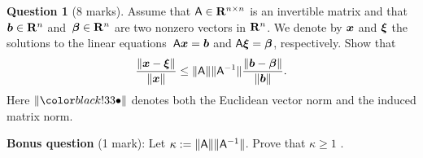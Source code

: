 \documentclass[11pt]{article}
\theoremstyle{definition}
\newtheorem{question}{Question}
\begin{document}
\newpage
\begin{question}
    [8 marks]
    Assume that $\mathsf A \in \mathbf R^{n \times n}$ is an invertible matrix
    and that $\mathbf{\boldsymbol{b}} \in \mathbf R^n$ and~$\mathbf{\boldsymbol{\beta}} \in \mathbf R^n$ are two nonzero vectors in $\mathbf R^n$.
    We denote by $\mathbf{\boldsymbol{x}}$ and $\mathbf{\boldsymbol{\xi}}$ the solutions to the linear equations~$\mathsf A \mathbf{\boldsymbol{x}} = \mathbf{\boldsymbol{b}}$ and $\mathsf A \mathbf{\boldsymbol{\xi}} = \mathbf{\boldsymbol{\beta}}$,
    respectively.
    Show that
    \[
        \frac{\lVert\mathbf{\boldsymbol{x}} - \mathbf{\boldsymbol{\xi}}\rVert}{\lVert\mathbf{\boldsymbol{x}}\rVert} \leq \lVert\mathsf A\rVert \lVert\mathsf A^{-1}\rVert \frac{\lVert\mathbf{\boldsymbol{b}} - \mathbf{\boldsymbol{\beta}}\rVert}{\lVert\mathbf{\boldsymbol{b}}\rVert}.
    \]
    Here $\norm{\placeholder}$ denotes both the Euclidean vector norm and the induced matrix norm.

    \noindent \textbf{Bonus question} (1 mark): Let $\kappa := \lVert\mathsf A\rVert \lVert\mathsf A^{-1}\rVert$. Prove that $\kappa \geq 1$ .
\end{question}
\end{document}
